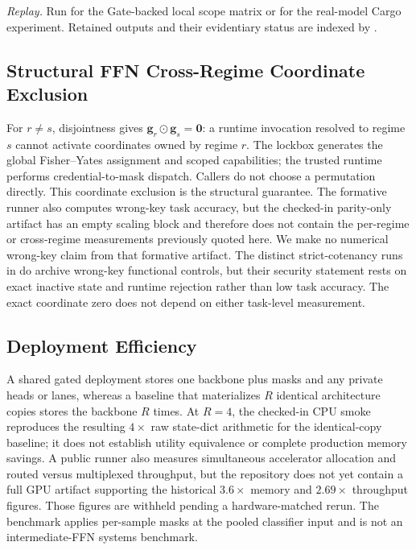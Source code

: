\documentclass[11pt,a4paper]{article}
\newcommand{\bg}{\mathbf{g}}
\begin{document}
\begin{sloppypar}
\noindent\textit{Replay.} Run
 for the Gate-backed local
scope matrix or
 for the
real-model Cargo experiment.  Retained outputs and their evidentiary
status are indexed by .
\end{sloppypar}

\subsection{Structural FFN Cross-Regime Coordinate Exclusion}
\label{sec:isolation}

For $r \neq s$, disjointness gives
$\bg_r \odot \bg_s=\mathbf{0}$: a runtime invocation resolved to
regime $s$ cannot activate coordinates owned by regime $r$.  The
lockbox generates the global Fisher--Yates assignment and scoped
capabilities; the trusted runtime performs credential-to-mask
dispatch.  Callers do
not choose a permutation directly.  This coordinate exclusion is
the structural guarantee.  The formative runner also computes
wrong-key task accuracy, but the checked-in parity-only artifact has
an empty scaling block and therefore does not contain the per-regime
or cross-regime measurements previously quoted here.  We make no
numerical wrong-key claim from that formative artifact.  The distinct
strict-cotenancy runs in  do archive
wrong-key functional controls, but their security statement rests on
exact inactive state and runtime rejection rather than low task
accuracy.  The exact coordinate zero does not depend on either
task-level measurement.

\subsection{Deployment Efficiency}
\label{sec:deployment}

A shared gated deployment stores one backbone plus masks and any
private heads or lanes, whereas a baseline that materializes $R$
identical architecture copies stores the backbone $R$ times.  At
$R{=}4$, the checked-in CPU smoke reproduces the resulting $4\times$
raw state-dict arithmetic for the identical-copy baseline; it does
not establish utility equivalence or complete production memory
savings.  A public runner
also measures simultaneous accelerator allocation and routed versus
multiplexed throughput, but the repository does not yet contain a
full GPU artifact supporting the historical $3.6\times$ memory and
$2.69\times$ throughput figures.  Those figures are withheld pending
a hardware-matched rerun.  The benchmark applies per-sample masks at
the pooled classifier input and is not an intermediate-FFN systems
benchmark.
\end{document}
